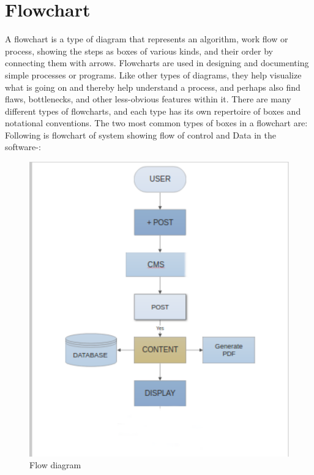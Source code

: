 
\section{Flowchart}
A flowchart is a type of diagram that represents an algorithm, work flow or process, showing the steps as boxes of various kinds, and their order by connecting them with arrows. 
Flowcharts are used in designing and documenting simple processes or programs. Like other types of diagrams, they help visualize what is going on and thereby help understand a process, and perhaps also find flaws, bottlenecks, and other less-obvious features within it. There are many different types of flowcharts, and each type has its own repertoire of boxes and notational conventions. The two most common types of boxes in a flowchart are:\\
Following is flowchart of system showing flow of control and Data in the software-:

\begin{figure}[h!]
\centering \includegraphics[scale=0.8]{input/images/fc.pdf}
\caption{ Flow diagram}
\label{fig:UI1}
\end{figure}



